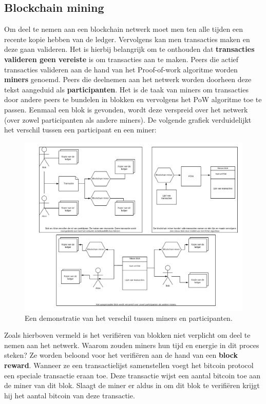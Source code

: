 \subsection{Blockchain mining}
Om deel te nemen aan een blockchain netwerk moet men ten alle tijden een recente kopie hebben van de ledger. Vervolgens kan men transacties maken en deze gaan valideren. Het is hierbij belangrijk om te onthouden dat \textbf{transacties valideren geen vereiste} is om transacties aan te maken. Peers die actief transacties valideren aan de hand van het Proof-of-work algoritme worden \textbf{miners} genoemd. Peers die deelnemen aan het netwerk worden doorheen deze tekst aangeduid als \textbf{participanten}. Het is de taak van miners om transacties door andere peers te bundelen in blokken en vervolgens het PoW algoritme toe te passen. Eenmaal een blok is gevonden, wordt deze verspreid over het netwerk (over zowel participanten als andere miners). De volgende grafiek verduidelijkt het verschil tussen een participant en een miner:

\begin{figure}[h!]
	\centering
		\includegraphics[scale=0.2]{blockchain-5.png}
	\caption[Blockchain - Voorstelling 5]{Een demonstratie van het verschil tussen miners en participanten.}
\end{figure}
\newpage

Zoals hierboven vermeld is het verifiëren van blokken niet verplicht om deel te nemen aan het netwerk. Waarom zouden miners hun tijd en energie in dit proces steken? Ze worden beloond voor het verifiëren aan de hand van een \textbf{block reward}. Wanneer ze een transactielijst samenstellen voegt het bitcoin protocol een speciale transactie eraan toe. Deze transactie wijst een aantal bitcoin toe aan de miner van dit blok. Slaagt de miner er aldus in om dit blok te verifiëren krijgt hij het aantal bitcoin van deze transactie.\\

